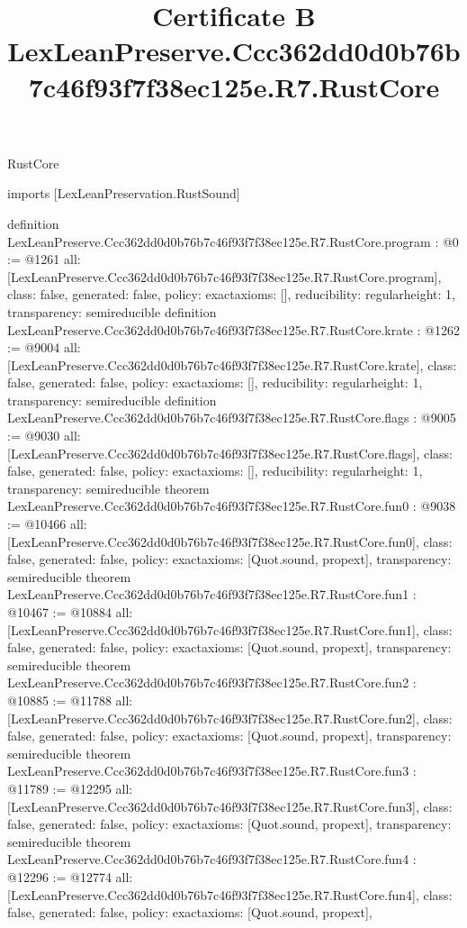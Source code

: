 \begin{lexlean}{RustCore}
\title{Certificate B LexLeanPreserve.Ccc362dd0d0b76b7c46f93f7f38ec125e.R7.RustCore}
\begin{coremodule}
imports [LexLeanPreservation.RustSound]

definition LexLeanPreserve.Ccc362dd0d0b76b7c46f93f7f38ec125e.R7.RustCore.program : @0 := @1261 {
  all: [LexLeanPreserve.Ccc362dd0d0b76b7c46f93f7f38ec125e.R7.RustCore.program],
  class: false,
  generated: false,
  policy: exact{axioms: []},
  reducibility: regular{height: 1},
  transparency: semireducible
}
definition LexLeanPreserve.Ccc362dd0d0b76b7c46f93f7f38ec125e.R7.RustCore.krate : @1262 := @9004 {
  all: [LexLeanPreserve.Ccc362dd0d0b76b7c46f93f7f38ec125e.R7.RustCore.krate],
  class: false,
  generated: false,
  policy: exact{axioms: []},
  reducibility: regular{height: 1},
  transparency: semireducible
}
definition LexLeanPreserve.Ccc362dd0d0b76b7c46f93f7f38ec125e.R7.RustCore.flags : @9005 := @9030 {
  all: [LexLeanPreserve.Ccc362dd0d0b76b7c46f93f7f38ec125e.R7.RustCore.flags],
  class: false,
  generated: false,
  policy: exact{axioms: []},
  reducibility: regular{height: 1},
  transparency: semireducible
}
theorem LexLeanPreserve.Ccc362dd0d0b76b7c46f93f7f38ec125e.R7.RustCore.fun0 : @9038 := @10466 {
  all: [LexLeanPreserve.Ccc362dd0d0b76b7c46f93f7f38ec125e.R7.RustCore.fun0],
  class: false,
  generated: false,
  policy: exact{axioms: [Quot.sound, propext]},
  transparency: semireducible
}
theorem LexLeanPreserve.Ccc362dd0d0b76b7c46f93f7f38ec125e.R7.RustCore.fun1 : @10467 := @10884 {
  all: [LexLeanPreserve.Ccc362dd0d0b76b7c46f93f7f38ec125e.R7.RustCore.fun1],
  class: false,
  generated: false,
  policy: exact{axioms: [Quot.sound, propext]},
  transparency: semireducible
}
theorem LexLeanPreserve.Ccc362dd0d0b76b7c46f93f7f38ec125e.R7.RustCore.fun2 : @10885 := @11788 {
  all: [LexLeanPreserve.Ccc362dd0d0b76b7c46f93f7f38ec125e.R7.RustCore.fun2],
  class: false,
  generated: false,
  policy: exact{axioms: [Quot.sound, propext]},
  transparency: semireducible
}
theorem LexLeanPreserve.Ccc362dd0d0b76b7c46f93f7f38ec125e.R7.RustCore.fun3 : @11789 := @12295 {
  all: [LexLeanPreserve.Ccc362dd0d0b76b7c46f93f7f38ec125e.R7.RustCore.fun3],
  class: false,
  generated: false,
  policy: exact{axioms: [Quot.sound, propext]},
  transparency: semireducible
}
theorem LexLeanPreserve.Ccc362dd0d0b76b7c46f93f7f38ec125e.R7.RustCore.fun4 : @12296 := @12774 {
  all: [LexLeanPreserve.Ccc362dd0d0b76b7c46f93f7f38ec125e.R7.RustCore.fun4],
  class: false,
  generated: false,
  policy: exact{axioms: [Quot.sound, propext]},
}
\end{coremodule}
\end{lexlean}
